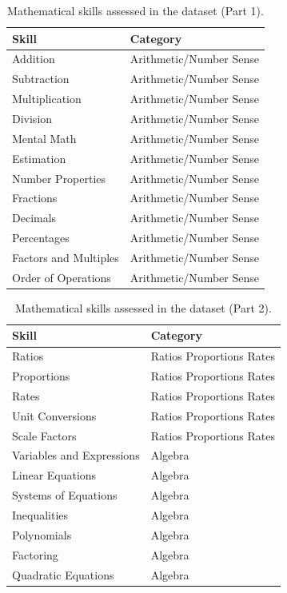 \documentclass[11pt]{article}
\begin{document}
\vspace{1em}

\begin{table}
\centering
\caption{Mathematical skills assessed in the dataset (Part 1).}
\begin{tabular}{p{}p{}}
\toprule
\textbf{Skill} & \textbf{Category} \\
\midrule

Addition & Arithmetic/Number Sense \\
Subtraction & Arithmetic/Number Sense \\
Multiplication & Arithmetic/Number Sense \\
Division & Arithmetic/Number Sense \\
Mental Math & Arithmetic/Number Sense \\
Estimation & Arithmetic/Number Sense \\
Number Properties & Arithmetic/Number Sense \\
Fractions & Arithmetic/Number Sense \\
Decimals & Arithmetic/Number Sense \\
Percentages & Arithmetic/Number Sense \\
Factors and Multiples & Arithmetic/Number Sense \\
Order of Operations & Arithmetic/Number Sense \\
\bottomrule
\end{tabular}
\end{table}

\begin{table}
\centering
\caption{Mathematical skills assessed in the dataset (Part 2).}
\begin{tabular}{p{}p{}}
\toprule
\textbf{Skill} & \textbf{Category} \\
\midrule
Ratios & Ratios Proportions Rates \\
Proportions & Ratios Proportions Rates \\
Rates & Ratios Proportions Rates \\
Unit Conversions & Ratios Proportions Rates \\
Scale Factors & Ratios Proportions Rates \\
Variables and Expressions & Algebra \\
Linear Equations & Algebra \\
Systems of Equations & Algebra \\
Inequalities & Algebra \\
Polynomials & Algebra \\
Factoring & Algebra \\
Quadratic Equations & Algebra \\
\bottomrule
\end{tabular}
\end{table}
\end{document}
